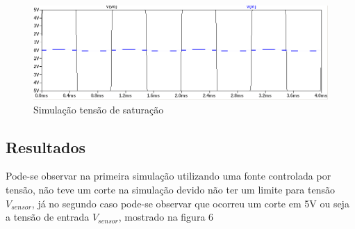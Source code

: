 \documentclass[a4paper, 12pt]{article}
\begin{document}
\begin{figure}[H]
\centering
\includegraphics[scale=0.5]{corte.png}
\caption{Simulação tensão de saturação}
\label{Rotulo}
\end{figure}

\subsection{Resultados}
Pode-se observar na primeira simulação utilizando uma fonte controlada por tensão, não teve um corte na simulação devido não ter um limite para tensão $V_{sensor}$,  já no segundo caso pode-se observar que ocorreu um corte em 5V ou seja a tensão de entrada $V_{sensor}$, mostrado na figura 6 
\end{document}
